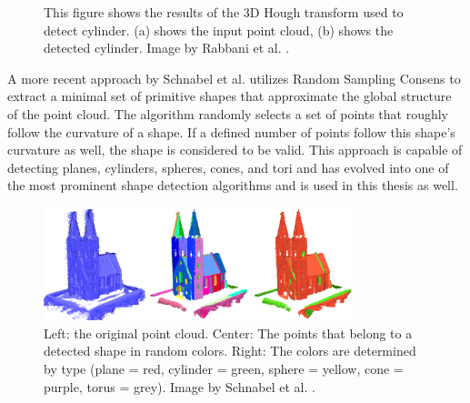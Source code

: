 \begin{figure}
\centering
{}
\caption[Results of 3d Hough transform used to detect cylinder]
{This figure shows the results of the 3D Hough transform used to detect cylinder. (a) shows the input point cloud, (b) shows the detected cylinder. Image by Rabbani et al. \cite{rabbani2005efficient}.}
\label{fig:hough_cylinder}
\end{figure}


A more recent approach by Schnabel et al. \cite{schnabel-2007-efficient} utilizes Random Sampling Consens \cite{fischler1981random} to extract a minimal set of primitive shapes that approximate the global structure of the point cloud. The algorithm randomly selects a set of points that roughly follow the curvature of a shape. If a defined number of points follow this shape's curvature as well, the shape is considered to be valid. This approach is capable of detecting planes, cylinders, spheres, cones, and tori and has evolved into one of the most prominent shape detection algorithms and is used in this thesis as well. 

\begin{figure}
    \centering
    \includegraphics[width=0.8\textwidth]{Related_Work/schnabel_example.png}%
    \caption[Church with points colored by detected shape]
		{Left: the original point cloud. Center: The points that belong to a detected shape in random colors. Right: The colors are determined by type (plane = red, cylinder = green, sphere = yellow, cone = purple, torus = grey). Image by Schnabel et al. \cite{schnabel-2007-efficient}. }
    \label{fig:schnabel_church}
\end{figure}

